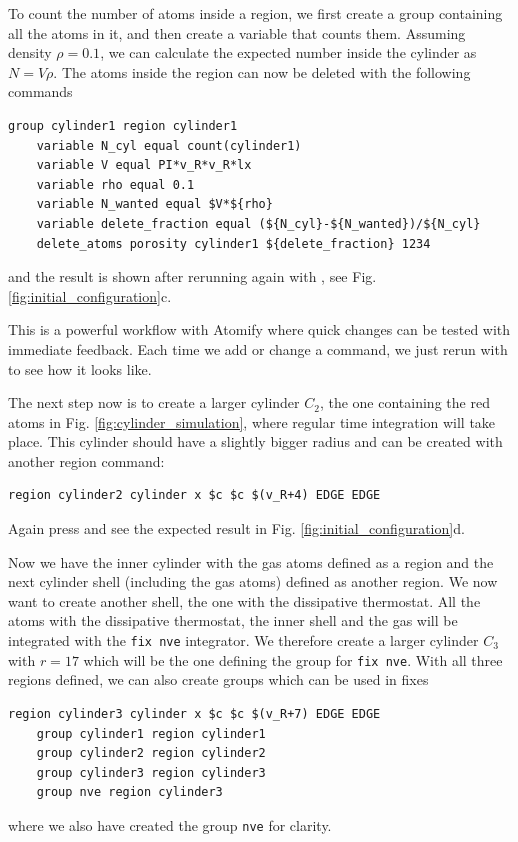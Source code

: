 \documentclass[aps,pre,twocolumn,letterpaper,floatfix,nofootinbib]{revtex4}
\newcommand{\code}[1]{\colorbox{light-gray}{\color{RawSienna}\texttt{#1}}}
\begin{document}
To count the number of atoms inside a region, we first create a group containing all the atoms in it, and then create a variable that counts them.
Assuming density $\rho = 0.1$, we can calculate the expected number inside the cylinder as $N = V\rho$.
The atoms inside the region can now be deleted with the following commands
\begin{lstlisting}[basicstyle=\tiny, frame = none, numbers=none, framexleftmargin=0pt, xleftmargin=-0.75cm, xrightmargin=0.0cm]
	group cylinder1 region cylinder1
	variable N_cyl equal count(cylinder1)
	variable V equal PI*v_R*v_R*lx
	variable rho equal 0.1
	variable N_wanted equal $V*${rho}
	variable delete_fraction equal (${N_cyl}-${N_wanted})/${N_cyl}
	delete_atoms porosity cylinder1 ${delete_fraction} 1234
\end{lstlisting}
and the result is shown after rerunning again with , see Fig. \ref{fig:initial_configuration}c.

This is a powerful workflow with Atomify where quick changes can be tested with immediate feedback.
Each time we add or change a command, we just rerun with  to see how it looks like.

The next step now is to create a larger cylinder $C_2$, the one containing the red atoms in Fig. \ref{fig:cylinder_simulation}, where regular time integration will take place.
This cylinder should have a slightly bigger radius and can be created with another region command:
\begin{lstlisting}[basicstyle=\tiny, frame = none, numbers=none, framexleftmargin=0pt, xleftmargin=-0.75cm, xrightmargin=0.0cm]
	region cylinder2 cylinder x $c $c $(v_R+4) EDGE EDGE
\end{lstlisting}
Again press  and see the expected result in Fig. \ref{fig:initial_configuration}d.

Now we have the inner cylinder with the gas atoms defined as a region and the next cylinder shell (including the gas atoms) defined as another region.
We now want to create another shell, the one with the dissipative thermostat.
All the atoms with the dissipative thermostat, the inner shell and the gas will be integrated with the \code{fix nve} integrator.
We therefore create a larger cylinder $C_3$ with $r=17$ which will be the one defining the group for \code{fix nve}.
With all three regions defined, we can also create groups which can be used in fixes
\begin{lstlisting}[basicstyle=\tiny, frame = none, numbers=none, framexleftmargin=0pt, xleftmargin=-0.75cm, xrightmargin=0.0cm]
	region cylinder3 cylinder x $c $c $(v_R+7) EDGE EDGE
	group cylinder1 region cylinder1
	group cylinder2 region cylinder2
	group cylinder3 region cylinder3
	group nve region cylinder3
\end{lstlisting}
where we also have created the group \code{nve} for clarity.
\end{document}
